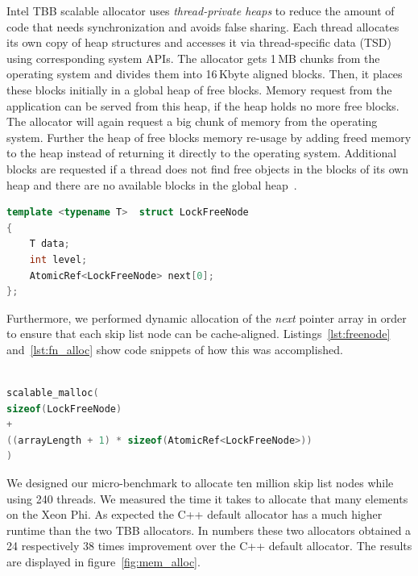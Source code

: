 Intel TBB scalable allocator uses \textit{thread-private heaps} to reduce the amount of code that needs synchronization and avoids false sharing. Each thread allocates its own copy of heap structures and accesses it via thread-specific data (TSD) using corresponding system APIs.
The allocator gets 1\,MB chunks from the operating system and divides them into 16\,Kbyte aligned blocks. Then, it places these blocks initially in a global heap of free blocks. Memory request from the application can be served from this heap, if the heap holds no more free blocks. The allocator will again request a big chunk of memory from the operating system. Further the heap of free blocks memory re-usage by adding freed memory to the heap instead of returning it directly to the operating system. Additional blocks are requested if a thread does not find free objects in the blocks of its own heap and there are no available blocks in the global heap~\cite{_thefoundations,Hudson:2006:MST:1133956.1133967}. %

\begin{lstlisting}[language=C++,basicstyle=\tt\scriptsize,captionpos=b,caption=Lock free node structure,label=lst:freenode,morekeywords={*, size_t}]
template <typename T>  struct LockFreeNode
{	
	T data;
	int	level;
	AtomicRef<LockFreeNode>	next[0];
};
\end{lstlisting}

Furthermore, we performed dynamic allocation of the {\em next} pointer array in order to ensure that each skip list node can be cache-aligned. Listings~\ref{lst:freenode} and~\ref{lst:fn_alloc} show code snippets of how this was accomplished.
\begin{lstlisting}[language=C++,basicstyle=\tt\scriptsize,captionpos=b,caption=Memory allocation instruction for array of atomic references,label=lst:fn_alloc, morekeywords={*, size_t}]

scalable_malloc(
sizeof(LockFreeNode) 
+ 
((arrayLength + 1) * sizeof(AtomicRef<LockFreeNode>))
)
\end{lstlisting}

We designed our micro-benchmark to allocate ten million skip list nodes while using 240 threads. We measured the time it takes to allocate that many elements on the Xeon Phi. As expected the C++ default allocator has a much higher runtime than the two TBB allocators. In numbers these two allocators obtained a 24 respectively 38 times improvement over the C++ default allocator. The results are displayed in figure~\ref{fig:mem_alloc}.

